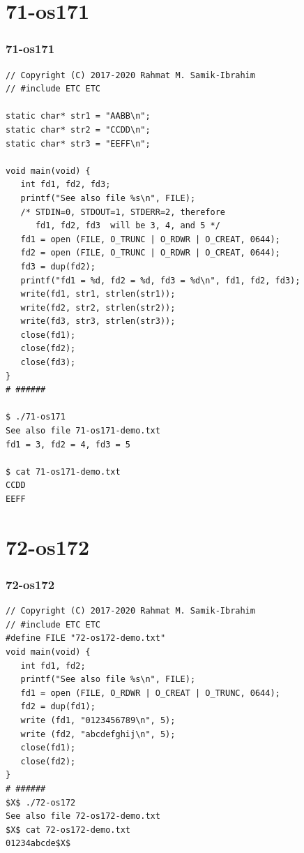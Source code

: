 \documentclass[xcolor=table, notheorems, hyperref={pdfpagelabels=false}]{beamer}
\begin{document}
\section{71-os171}
\begin{frame}[fragile]
\frametitle{71-os171}
\begin{lstlisting}[basicstyle=\ttfamily\tiny]
// Copyright (C) 2017-2020 Rahmat M. Samik-Ibrahim
// #include ETC ETC

static char* str1 = "AABB\n";
static char* str2 = "CCDD\n";
static char* str3 = "EEFF\n";

void main(void) {
   int fd1, fd2, fd3;
   printf("See also file %s\n", FILE);
   /* STDIN=0, STDOUT=1, STDERR=2, therefore 
      fd1, fd2, fd3  will be 3, 4, and 5 */
   fd1 = open (FILE, O_TRUNC | O_RDWR | O_CREAT, 0644);
   fd2 = open (FILE, O_TRUNC | O_RDWR | O_CREAT, 0644);
   fd3 = dup(fd2);
   printf("fd1 = %d, fd2 = %d, fd3 = %d\n", fd1, fd2, fd3);
   write(fd1, str1, strlen(str1));
   write(fd2, str2, strlen(str2));
   write(fd3, str3, strlen(str3));
   close(fd1);
   close(fd2);
   close(fd3);
}
# ######

$ ./71-os171 
See also file 71-os171-demo.txt
fd1 = 3, fd2 = 4, fd3 = 5

$ cat 71-os171-demo.txt 
CCDD
EEFF

\end{lstlisting}
\end{frame}

\section{72-os172}
\begin{frame}[fragile]
\frametitle{72-os172}
\begin{lstlisting}[basicstyle=\ttfamily\footnotesize]
// Copyright (C) 2017-2020 Rahmat M. Samik-Ibrahim
// #include ETC ETC
#define FILE "72-os172-demo.txt"
void main(void) {
   int fd1, fd2;
   printf("See also file %s\n", FILE);
   fd1 = open (FILE, O_RDWR | O_CREAT | O_TRUNC, 0644);
   fd2 = dup(fd1);
   write (fd1, "0123456789\n", 5);
   write (fd2, "abcdefghij\n", 5);
   close(fd1);
   close(fd2);
}
# ######
$X$ ./72-os172 
See also file 72-os172-demo.txt
$X$ cat 72-os172-demo.txt 
01234abcde$X$

\end{lstlisting}
\end{frame}
\end{document}
